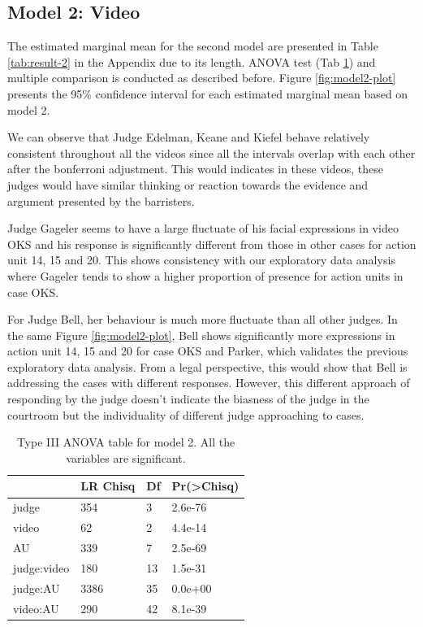 \documentclass{monashthesis}
\begin{document}
\hypertarget{model-2-video-1}{%
\subsection{Model 2: Video}\label{model-2-video-1}}

The estimated marginal mean for the second model are presented in Table \ref{tab:result-2} in the Appendix due to its length. ANOVA test (Tab \ref{tab:anova-2}) and multiple comparison is conducted as described before. Figure \ref{fig:model2-plot} presents the 95\% confidence interval for each estimated marginal mean based on model 2.

We can observe that Judge Edelman, Keane and Kiefel behave relatively consistent throughout all the videos since all the intervals overlap with each other after the bonferroni adjustment. This would indicates in these videos, these judges would have similar thinking or reaction towards the evidence and argument presented by the barristers.

Judge Gageler seems to have a large fluctuate of his facial expressions in video OKS and his response is significantly different from those in other cases for action unit 14, 15 and 20. This shows consistency with our exploratory data analysis where Gageler tends to show a higher proportion of presence for action units in case OKS.

For Judge Bell, her behaviour is much more fluctuate than all other judges. In the same Figure \ref{fig:model2-plot}, Bell shows significantly more expressions in action unit 14, 15 and 20 for case OKS and Parker, which validates the previous exploratory data analysis. From a legal perspective, this would show that Bell is addressing the cases with different responses. However, this different approach of responding by the judge doesn't indicate the biasness of the judge in the courtroom but the individuality of different judge approaching to cases.

\begin{table}

\caption{\label{tab:anova-2}\label{tab:anova-2}Type III ANOVA table for model 2. All the variables are significant.}
\centering
\begin{tabular}[t]{l|l|l|l}
\hline
  & LR Chisq & Df & Pr(>Chisq)\\
\hline
judge & 354 & 3 & 2.6e-76\\
\hline
video & 62 & 2 & 4.4e-14\\
\hline
AU & 339 & 7 & 2.5e-69\\
\hline
judge:video & 180 & 13 & 1.5e-31\\
\hline
judge:AU & 3386 & 35 & 0.0e+00\\
\hline
video:AU & 290 & 42 & 8.1e-39\\
\hline
\end{tabular}
\end{table}
\end{document}
